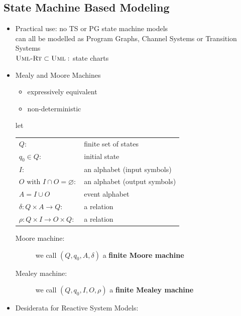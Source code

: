 \documentclass[a4paper, 10pt]{article}
\begin{document}
\subsection*{State Machine Based Modeling}
\begin{itemize}
    \item Practical use: no TS or PG \follows state machine models \\
    can all be modelled as Program Graphs, Channel Systems or Transition Systems \\
    $\textsc{Uml-Rt} \subset \textsc{Uml}:$ state charts
    \item Mealy and Moore Machines \\
    \begin{itemize}
        \item  expressively equivalent
        \item non-deterministic
    \end{itemize}
    \begin{shaded} let
    \begin{tabular}{ll}
        $Q:$ & finite set of states \\
        $q_0\in Q$: & initial state \\
        $I$: & an alphabet (input symbols) \\
        $O \textrm{ with }I\cap O=\varnothing:$ & an alphabet (output symbols) \\
        $A=I\cup O$ & event alphabet \\
        $\delta: Q\times A\to Q:$ & a relation \\
        $\rho: Q\times I\to O\times Q:$ & a relation \\
        \end{tabular}
    \begin{description}
        \item[Moore machine:] we call $(Q, q_0, A, \delta)$ a \textbf{finite Moore machine}
        \begin{center}
        \scalebox{1}{}
        \end{center}
        \item[Mealey machine:] we call $(Q,q_0,I,O,\rho)$ a \textbf{finite Mealey machine}
        \begin{center}
        \scalebox{1}{}
        \end{center}
    \end{description}
\end{shaded}
    \item Desiderata for Reactive System Models:

\end{itemize}
\end{document}
